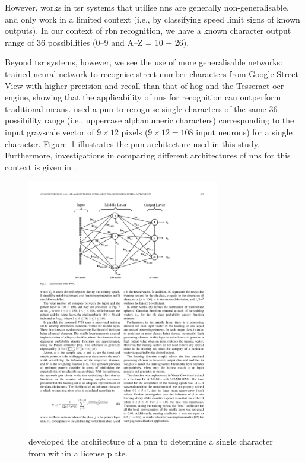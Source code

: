 However, works in \gls{tsr} systems that utilise \glspl{nn} are generally non-generalisable, and only work in a limited context (i.e., by classifying speed limit signs of known outputs). In our context of \gls{rbn} recognition, we have a known character output range of 36 possibilities (0--9 and A--Z = 10 + 26).

Beyond \gls{tsr} systems, however, we see the use of more generalisable networks: \citet{Netzer:2011to} trained neural network to recognise street number characters from Google Street View with higher precision and recall than that of \gls{hog} and the Tesseract \gls{ocr} engine, showing that the applicability of \glspl{nn} for recognition can outperform traditional means. \citet{Anagnostopoulos:2006wv} used a \gls{pnn} to recognise single characters of the same 36 possibility range (i.e., uppercase alphanumeric characters) corresponding to the input grayscale vector of $9 \times 12$ pixels ($9 \times 12 = 108$ input neurons) for a single character. Figure~\ref{fig:background:recognition:anagnostopoulos2006_nn} illustrates the \gls{pnn} architecture used in this study. Furthermore, investigations in comparing different architectures of \glspl{nn} for this context is given in \citet{Lee:2016uy}.

\begin{figure}[h]
  \centering
  \includegraphics[width=0.75\textwidth]{images/background/anagnostopoulos2006_nn}
  \caption[A PNN used to recognise license plate characters]{\citet{Anagnostopoulos:2006wv} developed the architecture of a \gls{pnn} to determine a single character from within a license plate.}
  \label{fig:background:recognition:anagnostopoulos2006_nn}
\end{figure}


